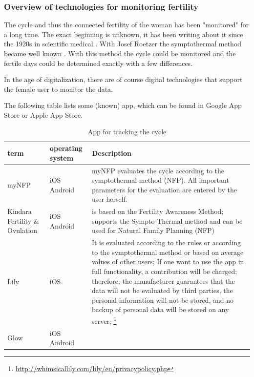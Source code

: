 \subsubsection{Overview of technologies for monitoring fertility}
The cycle and thus the connected fertility of the woman has been "monitored" for a long time. The exact beginning is unknown, it has been writing about it since the 1920s in scientific medical \cite{rotzer1988geschichte}. %
With Josef Roetzer the symptothermal method became well known \cite{roetzer1968erweiterte}. With this method the cycle could be monitored and the fertile days could be determined exactly with a few differences.

In the age of digitalization, there are of course digital technologies that support the female user to monitor the data.

The following table lists some (known) app, which can be found in Google App Store or Apple App Store.

\begin{table}[htb]
	\caption{App for tracking the cycle}
	\label{tab:typ_of_QR}
	\scriptsize
	\begin{center}
		\begin{tabular}{|p{1.5cm}|p{1cm}|p{4.5cm}|}
			\hline
			term & operating system  & Description \\
			\hline
			\hline
			myNFP &  iOS \newline Android &  myNFP evaluates the cycle according to the symptothermal method (NFP). All important parameters for the evaluation are entered by the user herself.
			\\
			\hline
			Kindara Fertility \& Ovulation  & iOS \newline Android & is based on the Fertility Awareness Method; supports the Sympto-Thermal method and can be used for Natural Family Planning (NFP) \\
			\hline
			Lily & iOS & It is evaluated according to the rules or according to the symptothermal method or based on average values of other users;
			If one want to use the app in full functionality, a contribution will be charged; therefore, the manufacturer guarantees that the data will not be evaluated by third parties, the personal information will not be stored, and no backup of personal data will be stored on any server; \footnote{\url{http://whimsicallily.com/lily/en/privacypolicy.php}} \\
			\hline
			Glow & iOS \newline Android & \\
			\hline
		\end{tabular}
	\end{center}
\end{table}

